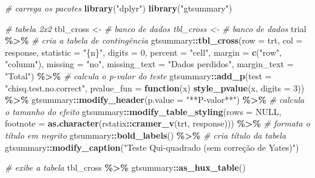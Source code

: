 \documentclass[
  a4paper,
]{book}
\newenvironment{Shaded}{\begin{snugshade}}{\end{snugshade}}
\newcommand{\AttributeTok}[1]{\textcolor[rgb]{0.13,0.29,0.53}{#1}}
\newcommand{\CommentTok}[1]{\textcolor[rgb]{0.56,0.35,0.01}{\textit{#1}}}
\newcommand{\ConstantTok}[1]{\textcolor[rgb]{0.56,0.35,0.01}{#1}}
\newcommand{\ControlFlowTok}[1]{\textcolor[rgb]{0.13,0.29,0.53}{\textbf{#1}}}
\newcommand{\DecValTok}[1]{\textcolor[rgb]{0.00,0.00,0.81}{#1}}
\newcommand{\FunctionTok}[1]{\textcolor[rgb]{0.13,0.29,0.53}{\textbf{#1}}}
\newcommand{\NormalTok}[1]{#1}
\newcommand{\OtherTok}[1]{\textcolor[rgb]{0.56,0.35,0.01}{#1}}
\newcommand{\SpecialCharTok}[1]{\textcolor[rgb]{0.81,0.36,0.00}{\textbf{#1}}}
\newcommand{\StringTok}[1]{\textcolor[rgb]{0.31,0.60,0.02}{#1}}
\begin{document}
\begin{Shaded}
\begin{Highlighting}[]
\CommentTok{\# carrega os pacotes}
\FunctionTok{library}\NormalTok{(}\StringTok{"dplyr"}\NormalTok{)}
\FunctionTok{library}\NormalTok{(}\StringTok{"gtsummary"}\NormalTok{)}

\CommentTok{\# tabela 2x2}
\NormalTok{tbl\_cross }\OtherTok{\textless{}{-}} \CommentTok{\# banco de dados tbl\_cross \textless{}{-} \# banco de dados}
\NormalTok{trial }\SpecialCharTok{\%\textgreater{}\%}
    \CommentTok{\# cria a tabela de contingência}
\NormalTok{gtsummary}\SpecialCharTok{::}\FunctionTok{tbl\_cross}\NormalTok{(}\AttributeTok{row =}\NormalTok{ trt, }\AttributeTok{col =}\NormalTok{ response, }\AttributeTok{statistic =} \StringTok{"\{n\}"}\NormalTok{, }\AttributeTok{digits =} \DecValTok{0}\NormalTok{, }\AttributeTok{percent =} \StringTok{"cell"}\NormalTok{,}
    \AttributeTok{margin =} \FunctionTok{c}\NormalTok{(}\StringTok{"row"}\NormalTok{, }\StringTok{"column"}\NormalTok{), }\AttributeTok{missing =} \StringTok{"no"}\NormalTok{, }\AttributeTok{missing\_text =} \StringTok{"Dados perdidos"}\NormalTok{,}
    \AttributeTok{margin\_text =} \StringTok{"Total"}\NormalTok{) }\SpecialCharTok{\%\textgreater{}\%}
    \CommentTok{\# calcula o p{-}valor do teste}
\NormalTok{gtsummary}\SpecialCharTok{::}\FunctionTok{add\_p}\NormalTok{(}\AttributeTok{test =} \StringTok{"chisq.test.no.correct"}\NormalTok{, }\AttributeTok{pvalue\_fun =} \ControlFlowTok{function}\NormalTok{(x) }\FunctionTok{style\_pvalue}\NormalTok{(x,}
    \AttributeTok{digits =} \DecValTok{3}\NormalTok{)) }\SpecialCharTok{\%\textgreater{}\%}
\NormalTok{    gtsummary}\SpecialCharTok{::}\FunctionTok{modify\_header}\NormalTok{(}\AttributeTok{p.value =} \StringTok{"**P{-}valor**"}\NormalTok{) }\SpecialCharTok{\%\textgreater{}\%}
    \CommentTok{\# calcula o tamanho do efeito}
\NormalTok{gtsummary}\SpecialCharTok{::}\FunctionTok{modify\_table\_styling}\NormalTok{(}\AttributeTok{rows =} \ConstantTok{NULL}\NormalTok{, }\AttributeTok{footnote =} \FunctionTok{as.character}\NormalTok{(rstatix}\SpecialCharTok{::}\FunctionTok{cramer\_v}\NormalTok{(trt,}
\NormalTok{    response))) }\SpecialCharTok{\%\textgreater{}\%}
    \CommentTok{\# formata o título em negrito}
\NormalTok{gtsummary}\SpecialCharTok{::}\FunctionTok{bold\_labels}\NormalTok{() }\SpecialCharTok{\%\textgreater{}\%}
    \CommentTok{\# cria título da tabela}
\NormalTok{gtsummary}\SpecialCharTok{::}\FunctionTok{modify\_caption}\NormalTok{(}\StringTok{"Teste Qui{-}quadrado (sem correção de Yates)"}\NormalTok{)}

\CommentTok{\# exibe a tabela}
\NormalTok{tbl\_cross }\SpecialCharTok{\%\textgreater{}\%}
\NormalTok{    gtsummary}\SpecialCharTok{::}\FunctionTok{as\_hux\_table}\NormalTok{()}
\end{Highlighting}
\end{Shaded}
\end{document}
